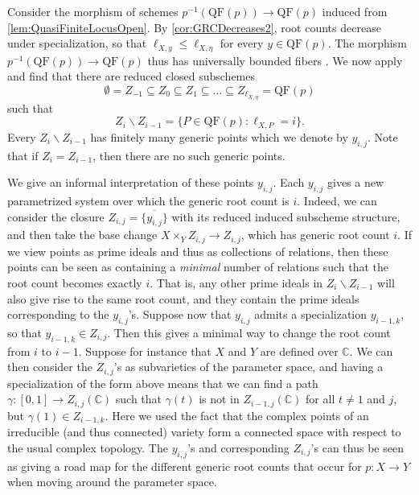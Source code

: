 \documentclass[12pt,reqno,a4paper]{amsart}
\theoremstyle{theoremstyle}
\theoremstyle{examplestyle}
\theoremstyle{algorithmstyle}
\begin{document}
Consider the morphism of schemes $p^{-1}(\mathrm{QF}(p))\to \mathrm{QF}(p)$ induced from \cref{lem:QuasiFiniteLocusOpen}.
By \cref{cor:GRCDecreases2}, root counts decrease under specialization, so that $\ell_{X,y}\leq\ell_{X,\eta}$ for every $y\in{\mathrm{QF}(p)}$. The morphism $p^{-1}(\mathrm{QF}(p))\to \mathrm{QF}(p)$ thus has universally bounded fibers \cite[\href{https://stacks.math.columbia.edu/tag/03J4}{Definition 03J4}]{stacks-project}. %
We now apply %
\cite[\href{https://stacks.math.columbia.edu/tag/07RY}{Lemma 07RY}]{stacks-project} %
and find that there are reduced closed subschemes
\begin{equation*}
    \emptyset=Z_{-1}\subseteq{}Z_{0}\subseteq{Z_{1}}\subseteq\dots\subseteq{Z_{\ell_{X,\eta}}}=\mathrm{QF}(p)
\end{equation*}
such that %
$$Z_{i}\backslash{Z_{i-1}}=\{P\in \mathrm{QF}(p):\ell_{X,P}=i\}.$$ %
Every $Z_{i}\backslash Z_{i-1}$ has finitely many generic points %
which we denote by $y_{i,j}$. Note that if $Z_{i}=Z_{i-1}$, then there are no such generic points.  %

We give an informal interpretation of these points $y_{i,j}$. Each $y_{i,j}$ gives a new parametrized system over which the generic root count is $i$. Indeed, we can consider the closure $Z_{i,j}=\overline{\{y_{i,j}\}}$ with its reduced induced subscheme structure, and then take the base change $X\times_{Y}Z_{i,j}\to Z_{i,j}$, which has generic root count $i$. If we view points as prime ideals and thus as collections of relations, then these points can be seen as containing a \emph{minimal} number of relations such that the root count becomes  exactly $i$. That is, any other prime ideals in $Z_{i}\backslash Z_{i-1}$ will also give rise to the same root count, and they contain the prime ideals corresponding to the $y_{i,j}$'s. Suppose now that $y_{i,j}$ admits a specialization %
$y_{i-1,k}$, %
so that $y_{i-1,k}\in Z_{i,j}$. Then this gives a minimal way to change the root count from $i$ to $i-1$. Suppose for instance that $X$ and $Y$ are defined over $\mathbb{C}$. We can then consider the $Z_{i,j}$'s as subvarieties %
of the parameter space, and having a specialization of the form above means that we can find a path $\gamma\colon [0,1]\to Z_{i,j}(\mathbb{C})$ such that $\gamma(t)$ is not in $Z_{i-1,j}(\mathbb{C})$ for all $t\neq{1}$ and $j$, but $\gamma(1)\in Z_{i-1,k}$. Here we used the fact that the complex points of an irreducible (and thus connected) variety form a connected space with respect to the usual complex topology. The $y_{i,j}$'s and corresponding $Z_{i,j}$'s can thus be seen as giving a road map for the different generic root counts that occur for $p:X\to Y$ when moving around the parameter space.
\end{document}
